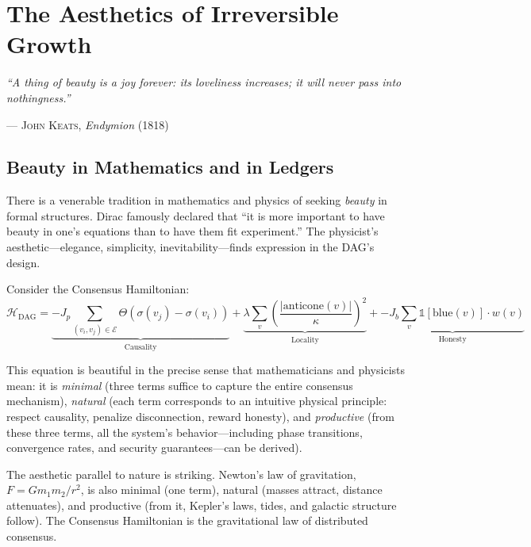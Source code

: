 \documentclass[12pt,a4paper]{article}
\theoremstyle{philosophical}
\begin{document}
\section{The Aesthetics of Irreversible Growth}

\epigraph{\textit{``A thing of beauty is a joy forever: its loveliness increases; it will never pass into nothingness.''}}{\textsc{--- John Keats}, \textit{Endymion} (1818)}

\subsection{Beauty in Mathematics and in Ledgers}

There is a venerable tradition in mathematics and physics of seeking \emph{beauty} in formal structures. Dirac famously declared that ``it is more important to have beauty in one's equations than to have them fit experiment.'' The physicist's aesthetic---elegance, simplicity, inevitability---finds expression in the DAG's design.

Consider the Consensus Hamiltonian:
\begin{equation}
\mathcal{H}_{\mathrm{DAG}} = \underbrace{-J_p \sum_{(v_i, v_j) \in \mathcal{E}} \Theta(\sigma(v_j) - \sigma(v_i))}_{\text{Causality}} + \underbrace{\lambda \sum_v \left(\frac{|\mathrm{anticone}(v)|}{\kappa}\right)^2}_{\text{Locality}} + \underbrace{-J_b \sum_v \mathbb{1}[\text{blue}(v)] \cdot w(v)}_{\text{Honesty}}
\end{equation}

This equation is beautiful in the precise sense that mathematicians and physicists mean: it is \emph{minimal} (three terms suffice to capture the entire consensus mechanism), \emph{natural} (each term corresponds to an intuitive physical principle: respect causality, penalize disconnection, reward honesty), and \emph{productive} (from these three terms, all the system's behavior---including phase transitions, convergence rates, and security guarantees---can be derived).

The aesthetic parallel to nature is striking. Newton's law of gravitation, $F = Gm_1m_2/r^2$, is also minimal (one term), natural (masses attract, distance attenuates), and productive (from it, Kepler's laws, tides, and galactic structure follow). The Consensus Hamiltonian is the gravitational law of distributed consensus.
\end{document}
